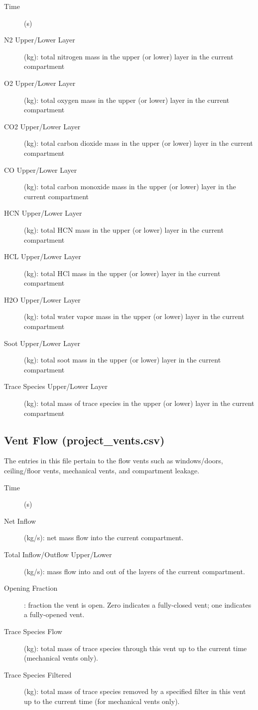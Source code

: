 \begin{description}
\item[Time] (s)
\item[N2 Upper/Lower Layer] (kg): total nitrogen mass in the upper (or lower) layer in the current compartment
\item[O2 Upper/Lower Layer] (kg): total oxygen mass in the upper (or lower) layer in the current compartment
\item[CO2 Upper/Lower Layer] (kg):  total carbon dioxide mass in the upper (or lower) layer in the current compartment
\item[CO Upper/Lower Layer] (kg):  total carbon monoxide mass in the upper (or lower) layer in the current compartment
\item[HCN Upper/Lower Layer] (kg):  total HCN mass in the upper (or lower) layer in the current compartment
\item[HCL Upper/Lower Layer] (kg):  total HCl mass in the upper (or lower) layer in the current compartment
\item[H2O Upper/Lower Layer] (kg):  total water vapor mass in the upper (or lower) layer in the current compartment
\item[Soot Upper/Lower Layer] (kg):  total soot mass in the upper (or lower) layer in the current compartment
\item[Trace Species Upper/Lower Layer] (kg):  total mass of trace species in the upper (or lower) layer in the current compartment
\end{description}

\subsection{Vent Flow (project\_vents.csv)}

The entries in this file pertain to the flow vents such as windows/doors, ceiling/floor vents, mechanical vents, and compartment leakage.
\begin{description}
\item[Time] (s)
\item[Net Inflow] (kg/s): net mass flow into the current compartment.
\item[Total Inflow/Outflow Upper/Lower] (kg/s): mass flow into and out of the layers of the current compartment.
\item[Opening Fraction]: fraction the vent is open. Zero indicates a fully-closed vent; one indicates a fully-opened vent.
\item[Trace Species Flow] (kg): total mass of trace species through this vent up to the current time (mechanical vents only).
\item[Trace Species Filtered] (kg): total mass of trace species removed by a specified filter in this vent up to the current time (for mechanical vents only).
\end{description}

